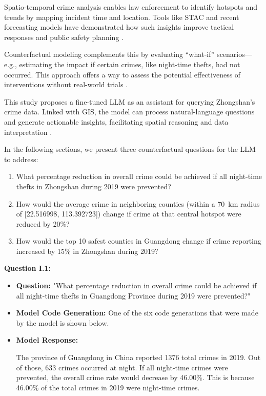 Spatio-temporal crime analysis enables law enforcement to identify hotspots and trends by mapping incident time and location. Tools like STAC and recent forecasting models have demonstrated how such insights improve tactical responses and public safety planning \cite{Li2024UrbanGPT}.

Counterfactual modeling complements this by evaluating “what-if” scenarios—e.g., estimating the impact if certain crimes, like night-time thefts, had not occurred. This approach offers a way to assess the potential effectiveness of interventions without real-world trials \cite{CONSTANTINOU201641}.

This study proposes a fine-tuned LLM as an assistant for querying Zhongshan’s crime data. Linked with GIS, the model can process natural-language questions and generate actionable insights, facilitating spatial reasoning and data interpretation \cite{William2025}.

\noindent In the following sections, we present three counterfactual questions for the LLM to address:

\begin{enumerate}
  \item What percentage reduction in overall crime could be achieved if all night-time thefts in Zhongshan during 2019 were prevented?
  \item How would the average crime in neighboring counties (within a 70~km radius of [22.516998, 113.392723]) change if crime at that central hotspot were reduced by 20\%?
  \item How would the top 10 safest counties in Guangdong change if crime reporting increased by 15\% in Zhongshan during 2019?
\end{enumerate}

\noindent\textbf{Question I.1:}
\begin{itemize}
    \item \textbf{Question:} "What percentage reduction in overall crime could be achieved if all night-time thefts in Guangdong Province during 2019 were prevented?"
    
    \item \textbf{Model Code Generation:} One of the six code generations that were made by the model is shown below. 
    

    \item \textbf{Model Response:}     
    \begin{tcolorbox}[colback=white!95!black, colframe=black, title=Q1 Response, fontupper=\scriptsize, boxsep=2pt, left=3pt, right=3pt]
    The province of Guangdong in China reported 1376 total crimes in 2019. Out of those, 633 crimes occurred at night. If all night-time crimes were prevented, the overall crime rate would decrease by 46.00\%. This is because 46.00\% of the total crimes in 2019 were night-time crimes.
    \end{tcolorbox}
\end{itemize}

